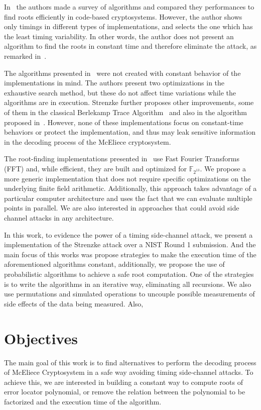In~\cite{strenzke2012fast} the authors made a survey of algorithms and compared they performances to find roots efficiently in code-based cryptosystems. However, the author shows only timings in different types of implementations, and selects the one which has the least timing variability. In other words, the author does not present an algorithm to find the roots in constant time and therefore eliminate the attack, as remarked in~\cite{strenzke2013efficiency}.

The algorithms presented in~\cite{strenzke2012fast} were not created with constant behavior of the implementations in mind. The authors present two optimizations in the exhaustive search method, but these do not affect time variations while the algorithms are in execution. Strenzke further proposes other improvements, some of them in the classical Berlekamp Trace Algorithm~\cite{berlekamp1970factoring} and also in the algorithm proposed in~\cite{fedorenko2002finding}. However, none of these implementations focus on constant-time behaviors or protect the implementation, and thus may leak sensitive information in the decoding process of the McEliece cryptosystem.

The root-finding implementations presented in~\cite{chou2017mcbits, bernstein2013mcbits} use Fast Fourier Transforms (FFT) and, while efficient, they are built and optimized for $\mathbb{F}_{2^{13}}$. We propose a more generic implementation that does not require specific optimizations on the underlying finite field arithmetic. Additionally, this approach takes advantage of a particular computer architecture and uses the fact that we can evaluate multiple points in parallel. We are also interested in approaches that could avoid side channel attacks in any architecture. 

In this work, to evidence the power of a timing side-channel attack, we present a implementation of the Strenzke attack over a NIST Round 1 submission. And the main focus of this works was propose strategies to make the execution time of the aforementioned algorithms constant, additionally, we propose the use of probabilistic algorithms to achieve a safe root computation. One of the strategies is to write the algorithms in an iterative way, eliminating all recursions. We also use permutations and simulated operations to uncouple possible measurements of side effects of the data being measured. Also, 

\section{Objectives}
The main goal of this work is to find alternatives to perform the decoding process of McEliece Cryptosystem in a safe way avoiding timing side-channel attacks. To achieve this, we are interested in building a constant way to compute roots of error locator polynomial, or remove the relation between the polynomial to be factorized and the execution time of the algorithm.


